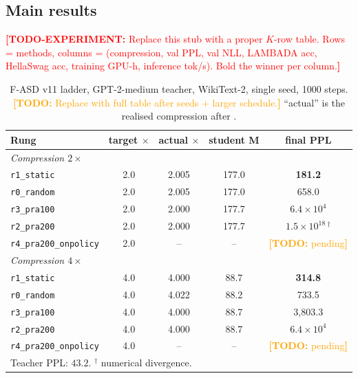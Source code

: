 \documentclass{article}
\newcommand{\todo}[1]{\textcolor{orange}{\textbf{[TODO:} #1\textbf{]}}}
\newcommand{\todoexp}[1]{\textcolor{red}{\textbf{[TODO-EXPERIMENT:} #1\textbf{]}}}
\newcommand{\fasd}{\texorpdfstring{\textsc{F-ASD}}{F-ASD}}
\begin{document}
\subsection{Main results}
\label{sec:exp:main}

\todoexp{Replace this stub with a proper $K$-row table. Rows = methods,
columns = (compression, val PPL, val NLL, LAMBADA acc, HellaSwag acc,
training GPU-h, inference tok/s). Bold the winner per column.}

\begin{table}[t]
\centering
\small
\caption{\fasd{} v11 ladder, GPT-2-medium teacher, WikiText-2,
single seed, 1000 steps. \todo{Replace with full table after seeds + larger
schedule.} ``actual'' is the realised compression after .}
\label{tab:v11}
\begin{tabular}{lcccc}
\toprule
Rung & target $\times$ & actual $\times$ & student M & final PPL\\
\midrule
\multicolumn{5}{l}{\emph{Compression $2\times$}} \\
\texttt{r1\_static}            & 2.0 & 2.005 & 177.0 & \textbf{181.2}    \\
\texttt{r0\_random}            & 2.0 & 2.005 & 177.0 & 658.0             \\
\texttt{r3\_pra100}            & 2.0 & 2.000 & 177.7 & $6.4\times10^{4}$ \\
\texttt{r2\_pra200}            & 2.0 & 2.000 & 177.7 & $1.5\times10^{18}\,^\dagger$ \\
\texttt{r4\_pra200\_onpolicy}  & 2.0 & --    & --    & \todo{pending}    \\
\midrule
\multicolumn{5}{l}{\emph{Compression $4\times$}} \\
\texttt{r1\_static}            & 4.0 & 4.000 & 88.7  & \textbf{314.8}    \\
\texttt{r0\_random}            & 4.0 & 4.022 & 88.2  & 733.5             \\
\texttt{r3\_pra100}            & 4.0 & 4.000 & 88.7  & 3{,}803.3         \\
\texttt{r2\_pra200}            & 4.0 & 4.000 & 88.7  & $6.4\times10^{4}$ \\
\texttt{r4\_pra200\_onpolicy}  & 4.0 & --    & --    & \todo{pending}    \\
\bottomrule
\multicolumn{5}{l}{\small Teacher PPL: $43.2$. $^\dagger$ numerical divergence.}
\end{tabular}
\end{table}
\end{document}
